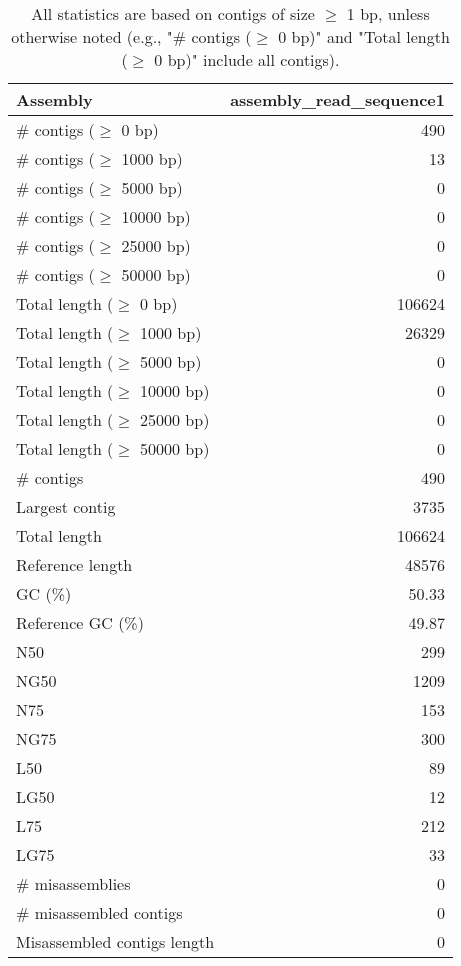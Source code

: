 \documentclass[12pt,a4paper]{article}
\begin{document}
\begin{table}[ht]
\begin{center}
\caption{All statistics are based on contigs of size $\geq$ 1 bp, unless otherwise noted (e.g., "\# contigs ($\geq$ 0 bp)" and "Total length ($\geq$ 0 bp)" include all contigs).}
\begin{tabular}{|l*{1}{|r}|}
\hline
Assembly & assembly\_read\_sequence1 \\ \hline
\# contigs ($\geq$ 0 bp) & 490 \\ \hline
\# contigs ($\geq$ 1000 bp) & 13 \\ \hline
\# contigs ($\geq$ 5000 bp) & 0 \\ \hline
\# contigs ($\geq$ 10000 bp) & 0 \\ \hline
\# contigs ($\geq$ 25000 bp) & 0 \\ \hline
\# contigs ($\geq$ 50000 bp) & 0 \\ \hline
Total length ($\geq$ 0 bp) & 106624 \\ \hline
Total length ($\geq$ 1000 bp) & 26329 \\ \hline
Total length ($\geq$ 5000 bp) & 0 \\ \hline
Total length ($\geq$ 10000 bp) & 0 \\ \hline
Total length ($\geq$ 25000 bp) & 0 \\ \hline
Total length ($\geq$ 50000 bp) & 0 \\ \hline
\# contigs & 490 \\ \hline
Largest contig & 3735 \\ \hline
Total length & 106624 \\ \hline
Reference length & 48576 \\ \hline
GC (\%) & 50.33 \\ \hline
Reference GC (\%) & 49.87 \\ \hline
N50 & 299 \\ \hline
NG50 & 1209 \\ \hline
N75 & 153 \\ \hline
NG75 & 300 \\ \hline
L50 & 89 \\ \hline
LG50 & 12 \\ \hline
L75 & 212 \\ \hline
LG75 & 33 \\ \hline
\# misassemblies & 0 \\ \hline
\# misassembled contigs & 0 \\ \hline
Misassembled contigs length & 0 \\ \hline

\end{tabular}
\end{center}
\end{table}
\end{document}
